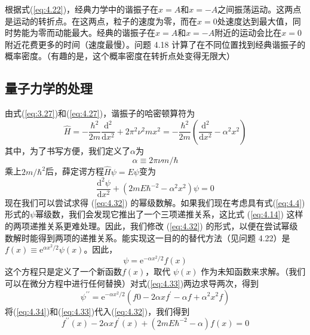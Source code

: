     根据式(\ref{eq:4.22})，经典力学中的谐振子在$x=A$和$x=-A$之间振荡运动。这两点是运动的转折点。在这两点，粒子的速度为零，而在$x=0$处速度达到最大值，同时势能为零而动能最大。经典的谐振子在$x=A$和$x=-A$附近的运动会比在$x=0$附近花费更多的时间（速度最慢）。问题 4.18 计算了在不同位置找到经典谐振子的概率密度。（有趣的是，这个概率密度在转折点处变得无限大）
    
\subsection*{量子力学的处理}
    由式(\ref{eq:3.27})和(\ref{eq:4.27})，谐振子的哈密顿算符为
    \begin{equation}
        \hat{H} = -\frac{\hbar^2}{2m}\frac{\mathrm{d}^2}{\mathrm{d}x^2} + 2\pi^2 \nu^2 m x^2 = -\frac{\hbar^2}{2m}\left(\frac{\mathrm{d}^2}{\mathrm{d}x^2} - \alpha^2x^2\right)
        \label{eq:4.30}
    \end{equation}
    其中，为了书写方便，我们定义了$\alpha$为
    \begin{equation}
        \alpha \equiv 2\pi\nu m/\hbar
        \label{eq:4.31}
    \end{equation}
    乘上$2m/\hbar^2$后，薛定谔方程$\hat{H}\psi = E\psi$变为
    \begin{equation}
        \frac{\mathrm{d}^2\psi}{\mathrm{d}x^2} + \left(2mE\hbar^{-2}-\alpha^2x^2\right)\psi = 0
        \label{eq:4.32}
    \end{equation}
    现在我们可以尝试求得 (\ref{eq:4.32}) 的幂级数解。如果我们现在考虑具有式(\ref{eq:4.4})形式的$\psi$幂级数，我们会发现它推出了一个三项递推关系，这比式 (\ref{eq:4.14}) 这样的两项递推关系更难处理。因此，我们修改 (\ref{eq:4.32}) 的形式，以便在尝试幂级数解时能得到两项的递推关系。能实现这一目的的替代方法（见问题 4.22）是$f\left(x\right) \equiv \mathrm{e}^{\alpha x^2/2}\psi\left(x\right)$。因此，
    \begin{equation}
        \psi = \mathrm{e}^{-\alpha x^2/2}f\left(x\right)
        \label{eq:4.33}
    \end{equation}
    这个方程只是定义了一个新函数$f\left(x\right)$，取代 $\psi\left(x\right)$ 作为未知函数来求解。（我们可以在微分方程中进行任何替换）对式(\ref{eq:4.33})两边求导两次，得到
    \begin{equation}
        \psi^{\prime\prime} = \mathrm{e}^{-\alpha x^2/2}\left(f0-2\alpha xf^{\prime} - \alpha f + \alpha^2x^2f\right)
        \label{eq:4.34}
    \end{equation}
    将(\ref{eq:4.34})和(\ref{eq:4.33})代入(\ref{eq:4.32})，我们得到
    \begin{equation}
        f^{\prime\prime}\left(x\right) - 2\alpha x f^{\prime}\left(x\right) + \left(2mE\hbar^{-2} - \alpha\right)f\left(x\right) = 0
        \label{eq:4.35}
    \end{equation}
